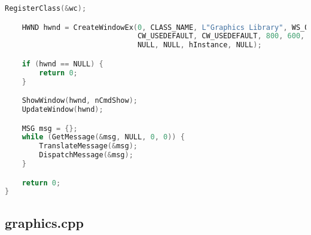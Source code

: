 \documentclass[11pt,a4paper]{article}
\begin{document}
\begin{lstlisting}[language=C++]
    RegisterClass(&wc);

    HWND hwnd = CreateWindowEx(0, CLASS_NAME, L"Graphics Library", WS_OVERLAPPEDWINDOW,
                               CW_USEDEFAULT, CW_USEDEFAULT, 800, 600,
                               NULL, NULL, hInstance, NULL);

    if (hwnd == NULL) {
        return 0;
    }

    ShowWindow(hwnd, nCmdShow);
    UpdateWindow(hwnd);

    MSG msg = {};
    while (GetMessage(&msg, NULL, 0, 0)) {
        TranslateMessage(&msg);
        DispatchMessage(&msg);
    }

    return 0;
}

\end{lstlisting}

\subsection{graphics.cpp}
\end{document}
